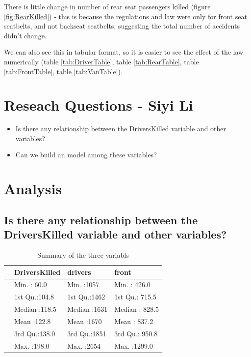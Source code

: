 \documentclass[11pt,a4paper,]{article}
\begin{document}
There is little change in number of rear seat passengers killed (figure \ref{fig:RearKilled}) - this is because the regulations and law were only for front seat seatbelts, and not backseat seatbelts, suggesting the total number of accidents didn't change.

We can also see this in tabular format, so it is easier to see the effect of the law numerically (table \ref{tab:DriverTable}, table \ref{tab:RearTable}, table \ref{tab:FrontTable}, table \ref{tab:VanTable}).

\clearpage

\hypertarget{reseach-questions---siyi-li}{%
\section{Reseach Questions - Siyi Li}\label{reseach-questions---siyi-li}}

\begin{itemize}
\item
  Is there any relationship between the DriversKilled variable and other variables?
\item
  Can we build an model among these variables?
\end{itemize}

\hypertarget{analysis}{%
\section{Analysis}\label{analysis}}

\hypertarget{is-there-any-relationship-between-the-driverskilled-variable-and-other-variables}{%
\subsection{Is there any relationship between the DriversKilled variable and other variables?}\label{is-there-any-relationship-between-the-driverskilled-variable-and-other-variables}}

\begin{table}

\caption{\label{tab:mytables}Summary of the three variabls}
\centering
\begin{tabular}[t]{l|l|l|l}
\hline
  & DriversKilled &    drivers &     front\\
\hline
 & Min.   : 60.0 & Min.   :1057 & Min.   : 426.0\\
\hline
 & 1st Qu.:104.8 & 1st Qu.:1462 & 1st Qu.: 715.5\\
\hline
 & Median :118.5 & Median :1631 & Median : 828.5\\
\hline
 & Mean   :122.8 & Mean   :1670 & Mean   : 837.2\\
\hline
 & 3rd Qu.:138.0 & 3rd Qu.:1851 & 3rd Qu.: 950.8\\
\hline
 & Max.   :198.0 & Max.   :2654 & Max.   :1299.0\\
\hline
\end{tabular}
\end{table}
\end{document}
